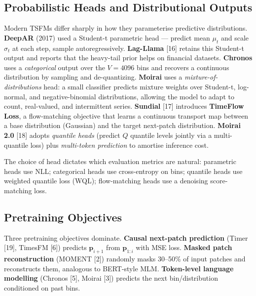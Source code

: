 \documentclass{article}
\begin{document}
\subsection{Probabilistic Heads and Distributional Outputs}\label{probabilistic-heads-and-distributional-outputs}

Modern TSFMs differ sharply in how they parameterise predictive distributions. \textbf{DeepAR} (2017) used a Student-t parametric head --- predict mean \(\mu_t\) and scale \(\sigma_t\) at each step, sample autoregressively. \textbf{Lag-Llama} {[}16{]} retains this Student-t output and reports that the heavy-tail prior helps on financial datasets. \textbf{Chronos} uses a \emph{categorical} output over the \(V=4096\) bins and recovers a continuous distribution by sampling and de-quantizing. \textbf{Moirai} uses a \emph{mixture-of-distributions} head: a small classifier predicts mixture weights over Student-t, log-normal, and negative-binomial distributions, allowing the model to adapt to count, real-valued, and intermittent series. \textbf{Sundial} \citep{liu2025calfaligningllmsfo} {[}17{]} introduces \textbf{TimeFlow Loss}, a flow-matching objective that learns a continuous transport map between a base distribution (Gaussian) and the target next-patch distribution. \textbf{Moirai 2.0} \citep{liu2025calfaligningllmsfo} {[}18{]} adopts \emph{quantile heads} (predict \(Q\) quantile levels jointly via a multi-quantile loss) plus \emph{multi-token prediction} to amortise inference cost.

The choice of head dictates which evaluation metrics are natural: parametric heads use NLL; categorical heads use cross-entropy on bins; quantile heads use weighted quantile loss (WQL); flow-matching heads use a denoising score-matching loss.

\subsection{Pretraining Objectives}\label{pretraining-objectives}

Three pretraining objectives dominate. \textbf{Causal next-patch prediction} (Timer {[}19{]}, TimesFM {[}6{]}) predicts \(\mathbf{p}_{i+1}\) from \(\mathbf{p}_{1:i}\) with MSE loss. \textbf{Masked patch reconstruction} (MOMENT {[}2{]}) randomly masks 30--50\% of input patches and reconstructs them, analogous to BERT-style MLM. \textbf{Token-level language modelling} (Chronos {[}5{]}, Moirai {[}3{]}) predicts the next bin/distribution conditioned on past bins.
\end{document}
